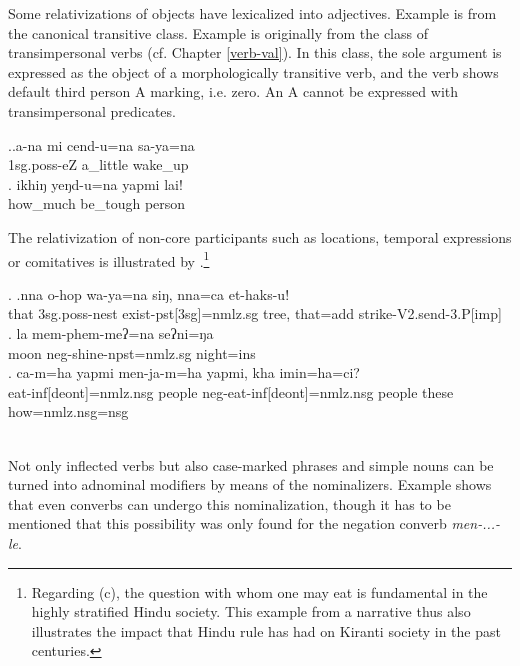 Some  relativizations of objects have lexicalized into adjectives. Example \Next[a] is from the canonical transitive class. Example \Next[b] is originally from the class of transimpersonal verbs (cf. Chapter \ref{verb-val}). In this class, the sole argument is expressed as the object of a morphologically transitive verb, and the verb shows default third person A marking, i.e. zero. An A cannot be expressed with transimpersonal predicates.


\ex.\ag.a-na mi cend-u=na sa-ya=na\\
{\sc 1sg.poss-}eZ  a\_little wake\_up \\
\bg. ikhiŋ yeŋd-u=na yapmi lai!\\
how\_much be\_tough person \\


The relativization of non-core participants such as locations, temporal expressions or comitatives is illustrated by \Next.\footnote{Regarding (c), the question with whom one may eat is fundamental in the highly stratified Hindu society. This example from a narrative thus also illustrates the impact that Hindu rule has had on Kiranti society in the past centuries.} 	
 
 
\ex. \ag.nna  o-hop wa-ya=na siŋ, nna=ca  et-haks-u!\\
		that {\sc 3sg.poss}-nest exist-{\sc pst[3sg]=nmlz.sg} tree, that{\sc =add} strike-{\sc V2.send-3.P[imp]}\\
	  
 	\bg. la   mem-phem-meʔ=na   seʔni=ŋa\\
	moon {\sc neg}-shine{\sc -npst=nmlz.sg} night{\sc =ins} 		\\
	 
	\bg. {ca-m}=ha  yapmi  men-ja-m=ha yapmi,  kha   imin=ha=ci?\\
	eat-{\sc inf[deont]=nmlz.nsg} people {\sc neg}-eat-{\sc inf[deont]=nmlz.nsg} people these how{\sc =nmlz.nsg=nsg} 		\\
	\\ 

	
Not only inflected verbs but also case-marked phrases \Next and simple nouns \NNext[a] can be turned into adnominal modifiers by means of the nominalizers. Example \NNext[b] shows that even converbs can undergo this nominalization, though it has to be mentioned that this possibility was only found for the negation converb \emph{men-...-le}.


